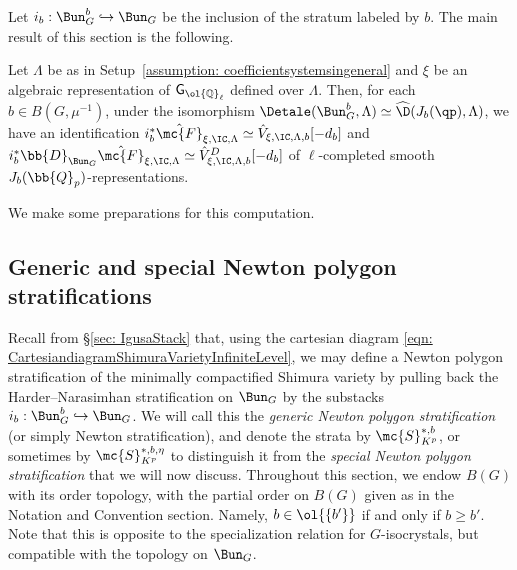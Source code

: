 \documentclass[letterpaper,11pt]{amsart}
\begin{document}
Let $i_b: \Bun_G^b\hookrightarrow \Bun_G$ be the inclusion of the stratum labeled by $b$. The main result of this section is the following.
\begin{theorem}\label{thm: stalks}
Let $\Lambda$ be as in Setup~\ref{assumption: coefficientsystemsingeneral} and $\xi$ be an algebraic representation of $\mathsf{G}_{\ol{\mathbb{Q}}_{\ell}}$ defined over $\Lambda$. Then, for each $b \in B(G,\mu^{-1})$, under the isomorphism $\Detale(\Bun_G^b,\Lambda)\simeq \widehat{\D}(J_b(\qp),\Lambda)$, we have an identification $i_b^\ast \hat{\mc{F}}_{\xi,\IC,\Lambda} \simeq \hat{V}_{\xi,\IC,\Lambda,b}[-d_b]$ and $i_b^\ast \bb{D}_{\Bun_{G}}\hat{\mc{F}}_{\xi,\IC,\Lambda} \simeq \hat{V}^{D}_{\xi,\IC,\Lambda,b}[-d_b]$ of $\ell$-completed smooth $J_{b}(\bb{Q}_{p})$-representations.
\end{theorem}
We make some preparations for this computation.

\subsection{Generic and special Newton polygon stratifications}\label{ss: GenericSpecialNP}
Recall from \S\ref{sec: IgusaStack} that, using the cartesian diagram \eqref{eqn: CartesiandiagramShimuraVarietyInfiniteLevel}, we may define a Newton polygon stratification of the minimally compactified Shimura variety by pulling back the Harder--Narasimhan stratification on $\Bun_G$ by the substacks $i_{b}: \Bun_{G}^{b} \hookrightarrow \Bun_{G}$. We will call this the \textit{generic Newton polygon stratification} (or simply Newton stratification), and denote the strata by $\mc{S}^{\ast,b}_{K^p}$, or sometimes by $\mc{S}^{\ast,b, \eta}_{K^p}$ to distinguish it from the \textit{special Newton polygon stratification} that we will now discuss. Throughout this section, we endow $B(G)$ with its order topology, with the partial order on $B(G)$ given as in the Notation and Convention section. Namely, $b\in\ol{\{b'\}}$ if and only if $b\geq b'$. Note that this is opposite to the specialization relation for $G$-isocrystals, but compatible with the topology on $\Bun_G$.
\end{document}
